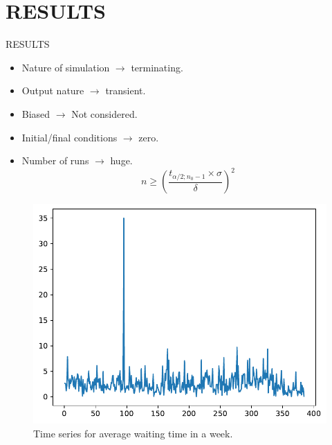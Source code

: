 \section{RESULTS}
\begin{frame}{RESULTS}
\begin{multicols}{2}
\begin{itemize}
    \item Nature of simulation $\rightarrow$ terminating.
    \item Output nature $\rightarrow$ transient.
    \item Biased $\rightarrow$ Not considered.
    \item Initial/final conditions $\rightarrow$ zero.
    \item Number of runs $\rightarrow$ huge.\\ 
\columnbreak
    \begin{equation*}
    n \geq\left(\frac{t_{\alpha/2;n_0-1} \times \sigma}{\delta}\right)^{2}
    \end{equation*}
\end{itemize}
\end{multicols}
\begin{figure}
    \centering
    \includegraphics[scale=.4]{images/time-series.pdf}
    \caption{Time series for average waiting time in a week.}
\end{figure}
\end{frame}

